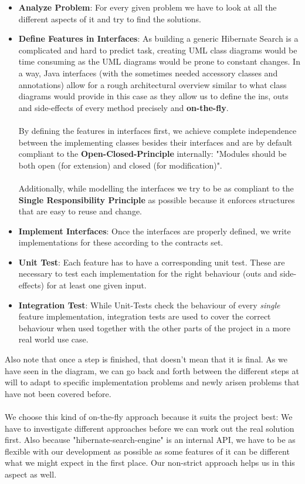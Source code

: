 \begin{itemize}
	\item \textbf{Analyze Problem}: For every given problem we have to look at all the different aspects of it and try to find the solutions.
	\item \textbf{Define Features in Interfaces}: As building a generic Hibernate Search is a complicated and hard to predict task, creating UML class diagrams would be time consuming as the UML diagrams would be prone to constant changes. In a way, Java interfaces (with the sometimes needed accessory classes and annotations) allow for a rough architectural overview similar to what class diagrams would provide in this case as they allow us to define the ins, outs and side-effects of every method precisely and \textbf{on-the-fly}.
	\\\\
	By defining the features in interfaces first, we achieve complete independence between the implementing classes besides their interfaces and are by default compliant to the \textbf{Open-Closed-Principle} internally: "Modules should be both open (for extension) and closed (for modification)".
	\\\\
	Additionally, while modelling the interfaces we try to be as compliant to the \textbf{Single Responsibility Principle} as possible because it enforces structures that are easy to reuse and change.
	\item \textbf{Implement Interfaces}: Once the interfaces are properly defined, we write implementations for these according to the contracts set.
	\item \textbf{Unit Test}: Each feature has to have a corresponding unit test. These are necessary to test each implementation for the right behaviour (outs and side-effects) for at least one given input.
	\item \textbf{Integration Test}: While Unit-Tests check the behaviour of every \textit{single} feature implementation, integration tests are used to cover the correct behaviour when used together with the other parts of the project in a more real world use case.
\end{itemize}
\noindent
Also note that once a step is finished, that doesn't mean that it is final. As we have seen in the diagram, we can go back and forth between the different steps at will to adapt to specific implementation problems and newly arisen problems that have not been covered before.
\\\\
We choose this kind of on-the-fly approach because it suits the project best: We have to investigate different approaches before we can work out the real solution first. Also because "hibernate-search-engine" is an internal API, we have to be as flexible with our development as possible as some features of it can be different what we might expect in the first place. Our non-strict approach helps us in this aspect as well.

\pagebreak
